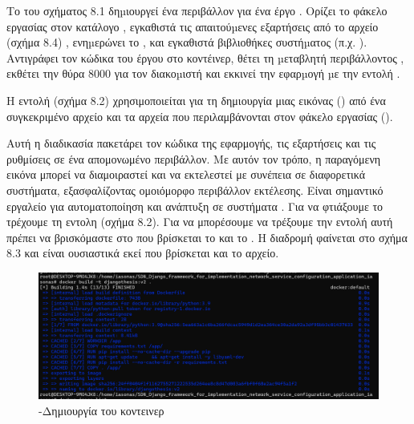 \FloatBarrier


Tο  του σχήματος 8.1 δηµιουργεί ένα περιβάλλον  για ένα έργο . Ορίζει το φάκελο εργασίας στον κατάλογο , εγκαθιστά τις απαιτούµενες εξαρτήσεις από το αρχείο (σχήμα 8.4) , ενηµερώνει το , και εγκαθιστά βιβλιοθήκες συστήµατος (π.χ. ). Αντιγράφει τον κώδικα του έργου  στο κοντέινερ, θέτει τη µεταβλητή περιβάλλοντος , εκθέτει την θύρα 8000 για τον διακοµιστή  και εκκινεί την εφαρµογή µε την εντολή .


Η εντολή (σχήμα 8.2) χρησιμοποιείται για τη δημιουργία μιας εικόνας  () 
από ένα συγκεκριμένο αρχείο  και τα αρχεία που περιλαμβάνονται στον φάκελο εργασίας ().

Αυτή η διαδικασία πακετάρει τον κώδικα της εφαρμογής, τις εξαρτήσεις και τις ρυθμίσεις σε ένα απομονωμένο περιβάλλον. 
Με αυτόν τον τρόπο, η παραγόμενη εικόνα μπορεί να διαμοιραστεί και να εκτελεστεί με συνέπεια σε διαφορετικά συστήματα, 
εξασφαλίζοντας ομοιόμορφο περιβάλλον εκτέλεσης. Είναι σημαντικό εργαλείο για αυτοματοποίηση και ανάπτυξη σε συστήματα . Για να φτιάξουμε το  τρέχουμε τη εντολη (σχήμα 8.2). Για να μπορέσουμε να τρέξουμε την εντολή αυτή πρέπει να βρισκόμαστε στο  που βρίσκεται το  και το . Η διαδρομή φαίνεται στο σχήμα 8.3 και είναι ουσιαστικά εκεί που βρίσκεται και το  αρχείο. 

\FloatBarrier

\begin{figure}[h]
	\centering
	\includegraphics[width=1.0\textwidth]{graphics/docker_build_v2.png}
	\caption{-Δημιουργία του κοντεινερ}
\end{figure}

\FloatBarrier


\FloatBarrier

